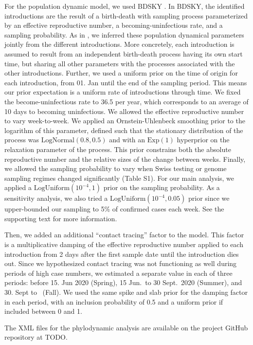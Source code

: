 \documentclass[9pt,twoside,lineno]{pnas-new}
\begin{document}
For the population dynamic model, we used BDSKY \cite{stadler2013birth}. In BDSKY, the identified introductions are the result of a birth-death with sampling process parameterized by an effective reproductive number, a becoming-uninfectious rate, and a sampling probability. As in \cite{Muller2020}, we inferred these population dynamical parameters jointly from the different introductions. More concretely, each introduction is assumed to result from an independent birth-death process having its own start time, but sharing all other parameters with the processes associated with the other introductions. 
Further, we used a uniform prior on the time of origin for each introduction, from 01. Jan until the end of the sampling period. This means our prior expectation is a uniform rate of introductions through time. We fixed the become-uninfectious rate to 36.5 per year, which corresponds to an average of 10 days to becoming uninfectious. We allowed the effective reproductive number to vary week-to-week. We applied an Ornstein-Uhlenbeck smoothing prior to the logarithm of this parameter, defined such that the stationary distribution of the process was $\text{LogNormal}(0.8, 0.5)$  and with an $\text{Exp}(1)$ hyperprior on the relaxation parameter of the process. This prior constrains both the absolute reproductive number and the relative sizes of the change between weeks. Finally, we allowed the sampling probability to vary when Swiss testing or genome sampling regimes changed significantly (Table S1). For our main analysis, we applied a $\text{LogUniform}(10^{-4}, 1)$ prior on the sampling probability. As a sensitivity analysis, we also tried a $\text{LogUniform}(10^{-4}, 0.05)$ prior since we upper-bounded our sampling to 5\% of confirmed cases each week. See the supporting text for more information.

Then, we added an additional ``contact tracing'' factor to the model. This factor is a multiplicative damping of the effective reproductive number applied to each introduction from 2 days after the first sample date until the introduction dies out. Since we hypothesized contact tracing was not functioning as well during periods of high case numbers, we estimated a separate value in each of three periods: before 15. Jun 2020 (Spring), 15 Jun.~to 30 Sept.~2020 (Summer), and 30. Sept to \maxdate\ (Fall). We used the same spike and slab prior for the damping factor in each period, with an inclusion probability of 0.5 and a uniform prior if included between 0 and 1. 

The XML files for the phylodynamic analysis are available on the project GitHub repository at TODO.
\end{document}
